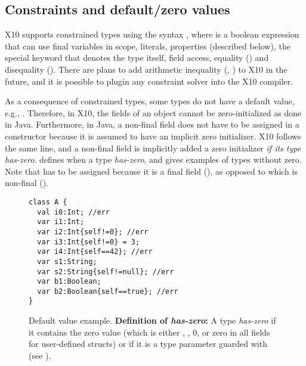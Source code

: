 \subsection{Constraints and default/zero values}
X10 supports constrained types using the syntax ,
    where  is a boolean expression that can use final variables in scope,
    literals, properties (described below),
    the special keyword 
    that denotes the type itself,
    field access, equality (\code{==}) and disequality (\code{!=}).
There are plans to add arithmetic inequality (\code{<}, \code{<=})
    to X10 in the future,
    and it is possible to plugin any constraint solver into the X10 compiler.

As a consequence of constrained types,
    some types do not have a default value, e.g., .
Therefore, in X10, the fields of an object cannot be zero-initialized as done in Java.
Furthermore, in Java, a non-final field does not have to be assigned in a constructor
    because it is assumed to have an implicit zero initializer.
X10 follows the same line, and a non-final field is implicitly added a zero initializer
    \emph{if its type has-zero}.
 defines when a type \emph{has-zero},
    and gives examples of types without zero.
Note that  has to be assigned because it is a final field (),
    as opposed to  which is non-final ().

\begin{figure}
\begin{lstlisting}
class A {
  val i0:Int; //err
  var i1:Int;
  var i2:Int{self!=0}; //err
  var i3:Int{self!=0} = 3;
  var i4:Int{self==42}; //err
  var s1:String;
  var s2:String{self!=null}; //err
  var b1:Boolean;
  var b2:Boolean{self==true}; //err
}
\end{lstlisting}
\caption{Default value example.
    \textbf{Definition of \emph{has-zero}:}
        {A type \emph{has-zero} if it contains the zero value
            (which is either , , 0, or
                zero in all fields for user-defined structs)
            or if it is a type parameter guarded with  (see ).}
    }
\label{Figure:Constraints}
\end{figure}


